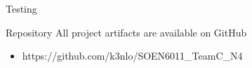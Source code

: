 \documentclass[final]{beamer}
\newlength{\sepwid}
\newlength{\onecolwid}
\newlength{\twocolwid}
\begin{document}
\begin{frame}[t]
\begin{columns}[t]
\begin{column}{\twocolwid}
\begin{columns}[t,totalwidth=\twocolwid]
\begin{column}{\onecolwid}
\begin{block}{Testing}
\end{block}

\begin{block}{Repository}
All project artifacts are available on GitHub
\begin{itemize}
\item https://github.com/k3nlo/SOEN6011\_TeamC\_N4
\end{itemize}

\end{block}




\end{column} %

\end{columns} %

\end{column} %

\begin{column}{\sepwid}\end{column} %

\begin{column}{\onecolwid} %












\end{column}
\end{columns}
\end{frame}
\end{document}
